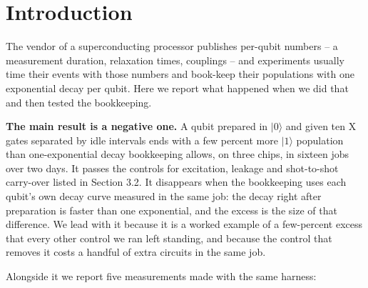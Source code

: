 \documentclass[11pt]{article}
\begin{document}
\section{Introduction}
The vendor of a superconducting processor publishes per-qubit numbers -- a measurement duration, relaxation times, couplings -- and experiments usually time their events with those numbers and book-keep their populations with one exponential decay per qubit. Here we report what happened when we did that and then tested the bookkeeping.

\textbf{The main result is a negative one.} A qubit prepared in \(|0\rangle\) and given ten X gates separated by idle intervals ends with a few percent more \(|1\rangle\) population than one-exponential decay bookkeeping allows, on three chips, in sixteen jobs over two days. It passes the controls for excitation, leakage and shot-to-shot carry-over listed in Section 3.2. It disappears when the bookkeeping uses each qubit's own decay curve measured in the same job: the decay right after preparation is faster than one exponential, and the excess is the size of that difference. We lead with it because it is a worked example of a few-percent excess that every other control we ran left standing, and because the control that removes it costs a handful of extra circuits in the same job.

Alongside it we report five measurements made with the same harness:
\end{document}
